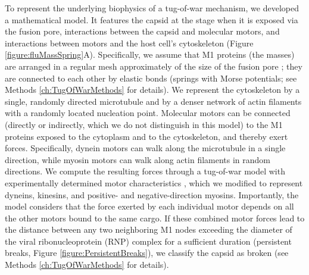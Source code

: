To represent the underlying biophysics of a tug-of-war mechanism, we developed a mathematical model. It features the capsid at the stage when it is exposed via the fusion pore, interactions between the capsid and molecular motors, and interactions between motors and the host cell’s cytoskeleton (Figure \ref{figure:fluMassSpring}A). Specifically, we assume that M1 proteins (the masses) are arranged in a regular mesh approximately of the size of the fusion pore \cite{hilsch2014influenza}; they are connected to each other by elastic bonds (springs with Morse potentials; see Methods \ref{ch:TugOfWarMethods} for details). We represent the cytoskeleton by a single, randomly directed microtubule and by a denser network of actin filaments with a randomly located nucleation point. Molecular motors can be connected (directly or indirectly, which we do not distinguish in this model) to the M1 proteins exposed to the cytoplasm and to the cytoskeleton, and thereby exert forces. Specifically, dynein motors can walk along the microtubule in a single direction, while myosin motors can walk along actin filaments in random directions. We compute the resulting forces through a tug-of-war model with experimentally determined motor characteristics \cite{gennerich2007force, muller2008tug, norstrom2010unconventional}, which we modified to represent dyneins, kinesins, and positive- and negative-direction myosins. Importantly, the model considers that the force exerted by each individual motor depends on all the other motors bound to the same cargo. If these combined motor forces lead to the distance between any two neighboring M1 nodes exceeding the diameter of the viral ribonucleoprotein (RNP) complex for a sufficient duration (persistent breaks, Figure \ref{figure:PersistentBreaks}), we classify the capsid as broken (see Methods \ref{ch:TugOfWarMethods} for details).

